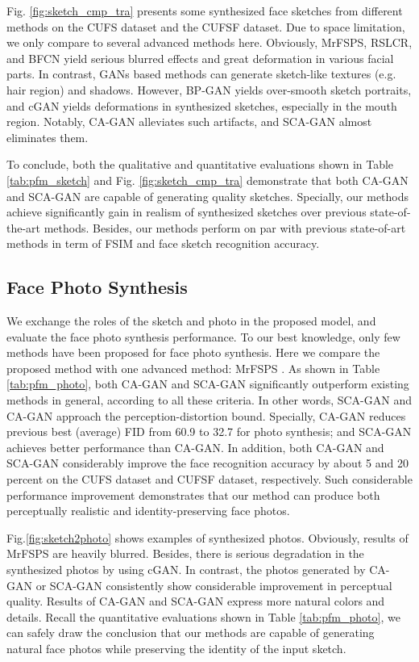 \documentclass[journal]{IEEEtran}
\begin{document}
Fig. \ref{fig:sketch_cmp_tra} presents some synthesized face sketches from different methods on the CUFS dataset and the CUFSF dataset. Due to space limitation, we only compare to several advanced methods here. Obviously, MrFSPS, RSLCR, and BFCN yield serious blurred effects and great deformation in various facial parts. In contrast, GANs based methods can generate sketch-like textures (e.g. hair region) and shadows. However, BP-GAN yields over-smooth sketch portraits, and cGAN yields deformations in synthesized sketches, especially in the mouth region. Notably, CA-GAN alleviates such artifacts, and SCA-GAN almost eliminates them. 

To conclude, both the qualitative and quantitative evaluations shown in Table \ref{tab:pfm_sketch} and Fig. \ref{fig:sketch_cmp_tra} demonstrate that both CA-GAN and SCA-GAN are capable of generating quality sketches. Specially, our methods achieve significantly gain in realism of synthesized sketches over previous state-of-the-art methods. Besides, our methods perform on par with previous state-of-art methods in term of FSIM and face sketch recognition accuracy.


\subsection{Face Photo Synthesis}
\label{sec:sketch2photo}

We exchange the roles of the sketch and photo in the proposed model, and evaluate the face photo synthesis performance. 
To our best knowledge, only few methods have been proposed for face photo synthesis. Here we compare the proposed method with one advanced method: MrFSPS \cite{Peng2016Multiple}. As shown in Table \ref{tab:pfm_photo}, 
both CA-GAN and SCA-GAN significantly outperform existing methods in general, according to all these criteria. In other words, SCA-GAN and CA-GAN approach the perception-distortion bound. Specially, CA-GAN reduces previous best (average) FID from 60.9 to 32.7 for photo synthesis; and SCA-GAN achieves better performance than CA-GAN. In addition, both CA-GAN and SCA-GAN considerably improve the face recognition accuracy by about 5 and 20 percent on the CUFS dataset and CUFSF dataset, respectively. 
Such considerable performance improvement demonstrates that our method can produce both perceptually realistic and identity-preserving face photos. 

Fig.\ref{fig:sketch2photo} shows examples of synthesized photos. Obviously, results of MrFSPS are heavily blurred. Besides, there is serious degradation in the synthesized photos by using cGAN. In contrast, the photos generated by CA-GAN or SCA-GAN consistently show considerable improvement in perceptual quality. Results of CA-GAN and SCA-GAN express more natural colors and details. Recall the quantitative evaluations shown in Table \ref{tab:pfm_photo}, we can safely draw the conclusion that our methods are capable of generating natural face photos while preserving the identity of the input sketch. 
\end{document}
